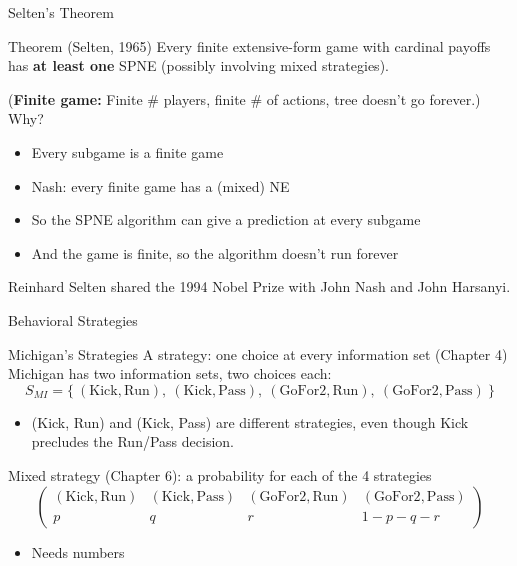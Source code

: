 \begin{frame}{Selten's Theorem}
\begin{block}{Theorem (Selten, 1965)}
Every finite extensive-form game with cardinal payoffs has \textbf{at least one} SPNE (possibly involving mixed strategies).
\end{block}
(\textbf{Finite game:} Finite \# players, finite \# of actions, tree doesn't go forever.)
\bsk
Why?
\begin{itemize}
    \item Every subgame is a finite game
    \item Nash: every finite game has a (mixed) NE
    \item So the SPNE algorithm can give a prediction at every subgame
    \item And the game is finite, so the algorithm doesn't run forever
\end{itemize}
\vfill
{\footnotesize Reinhard Selten shared the 1994 Nobel Prize with John Nash and John Harsanyi.}
\vspace{-0.2in}
\end{frame}


\begin{frame}[standout]
Behavioral Strategies
\end{frame}

\begin{frame}{Michigan's Strategies}
A strategy: one choice at every information set (Chapter 4)
\bsk
Michigan has two information sets, two choices each:
$$S_{MI}=\{\ (\text{Kick},\text{Run}),\ (\text{Kick},\text{Pass}),\ (\text{GoFor2},\text{Run}),\ (\text{GoFor2},\text{Pass})\ \}$$
\vspace{-0.1in}
\begin{itemize}
    \item (Kick, Run) and (Kick, Pass) are different strategies, even though Kick precludes the Run/Pass decision.
\end{itemize}
\bsk
Mixed strategy (Chapter 6): a probability for each of the 4 strategies
$$\begin{pmatrix} (\text{Kick},\text{Run}) & (\text{Kick},\text{Pass}) & (\text{GoFor2},\text{Run}) & (\text{GoFor2},\text{Pass}) \\ p & q & r & 1-p-q-r\end{pmatrix}$$
\vspace{-0.1in}
\begin{itemize}
    \item Needs \underline{\hspace{0.4in}} numbers
\end{itemize}
\vfill
\vspace{-0.3in}
\end{frame}

